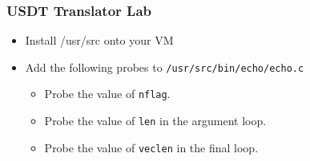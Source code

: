 \documentclass[pdftex]{beamer}
\begin{document}
\begin{frame}[fragile]
  \frametitle{USDT Translator Lab}
  \begin{itemize}
  \item Install /usr/src onto your VM
  \item Add the following probes to \verb|/usr/src/bin/echo/echo.c|
    \begin{itemize}
    \item Probe the value of \verb|nflag|.
    \item Probe the value of \verb|len| in the argument loop.
    \item Probe the value of \verb|veclen| in the final loop.
    \end{itemize}
  \end{itemize}
\end{frame}
\end{document}
